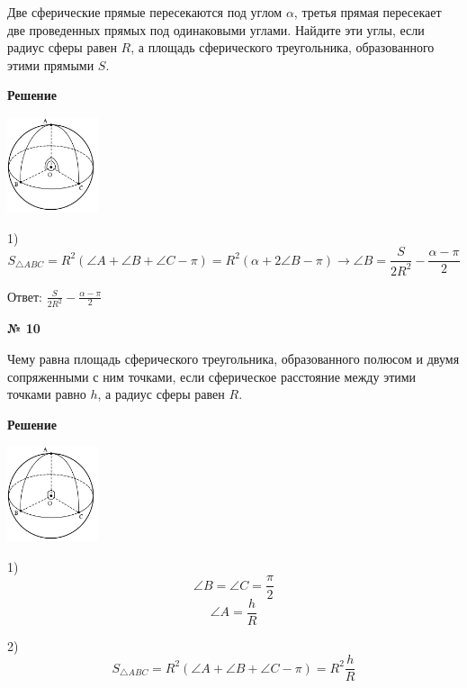     Две сферические прямые пересекаются под углом $\alpha$, третья прямая пересекает две проведенных прямых
    под одинаковыми углами.
    Найдите эти углы, если радиус сферы равен $R$, а площадь сферического треугольника, образованного этими прямыми $S$.

    \textbf{Решение}\\

    \begin{center}
        \includegraphics[width=0.2\textwidth]{images/img4}\\
    \end{center}

    1)
    \[
        S_{\triangle ABC} = R^2(\angle A + \angle B + \angle C - \pi) =  R^2(\alpha + 2\angle B - \pi)\rightarrow
        \angle B = \frac{S}{2R^2} - \frac{\alpha- \pi}{2}
    \]

    Ответ: $\frac{S}{2R^2} - \frac{\alpha- \pi}{2} $

    \begin{center}
        \textbf{№ 10}
    \end{center}

    Чему равна площадь сферического треугольника, образованного полюсом и двумя сопряженными с ним точками,
    если сферическое расстояние между этими точками равно $h$, а радиус сферы равен $R$.

    \textbf{Решение}\\

    \begin{center}
        \includegraphics[width=0.2\textwidth]{images/img5}\\
    \end{center}

    1)
    \[
        \angle B = \angle C = \frac{\pi}{2}
    \]
    \[
        \angle A = \frac{h}{R}
    \]

    2) \[
           S_{\triangle ABC} = R^2(\angle A + \angle B + \angle C - \pi) = R^2\frac{h}{R}
    \]

